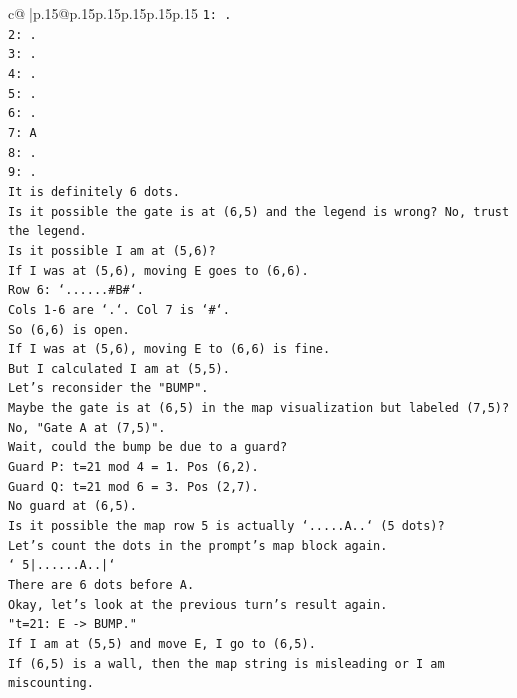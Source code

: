 \documentclass{article}
\begin{document}
{\begin{supertabular}{c@{$\;$}|p{.15\linewidth}@{}p{.15\linewidth}p{.15\linewidth}p{.15\linewidth}p{.15\linewidth}p{.15\linewidth}}
{{{\texttt{1: .} \\
\texttt{2: .} \\
\texttt{3: .} \\
\texttt{4: .} \\
\texttt{5: .} \\
\texttt{6: .} \\
\texttt{7: A} \\
\texttt{8: .} \\
\texttt{9: .} \\
\texttt{It is definitely 6 dots.} \\
\texttt{Is it possible the gate is at (6,5) and the legend is wrong? No, trust the legend.} \\
\texttt{Is it possible I am at (5,6)?} \\
\texttt{If I was at (5,6), moving E goes to (6,6).} \\
\texttt{Row 6: `......\#B\#`.} \\
\texttt{Cols 1{-}6 are `.`. Col 7 is `\#`.} \\
\texttt{So (6,6) is open.} \\
\texttt{If I was at (5,6), moving E to (6,6) is fine.} \\
\texttt{But I calculated I am at (5,5).} \\
\texttt{Let's reconsider the "BUMP".} \\
\texttt{Maybe the gate is at (6,5) in the map visualization but labeled (7,5)?} \\
\texttt{No, "Gate A at (7,5)".} \\
\texttt{Wait, could the bump be due to a guard?} \\
\texttt{Guard P: t=21 mod 4 = 1. Pos (6,2).} \\
\texttt{Guard Q: t=21 mod 6 = 3. Pos (2,7).} \\
\texttt{No guard at (6,5).} \\
\texttt{Is it possible the map row 5 is actually `.....A..` (5 dots)?} \\
\texttt{Let's count the dots in the prompt's map block again.} \\
\texttt{` 5|......A..|`} \\
\texttt{There are 6 dots before A.} \\
\texttt{Okay, let's look at the previous turn's result again.} \\
\texttt{"t=21: E {-}> BUMP."} \\
\texttt{If I am at (5,5) and move E, I go to (6,5).} \\
\texttt{If (6,5) is a wall, then the map string is misleading or I am miscounting.} \\
}}}
\end{supertabular}}
\end{document}
